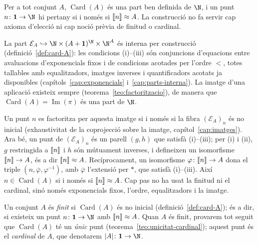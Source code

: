\begin{proposicio}\label{prop:card-interna}
Per a tot conjunt \(A\), \(\operatorname{Card}(A)\) és una part ben
definida de \(\N\), i un punt \(n\colon\mathbf1\to\N\) hi pertany si i
només si \(\llbracket n\rrbracket\approx A\). La construcció no fa servir cap axioma
d'elecció ni cap noció prèvia de finitud o cardinal.
\end{proposicio}

\begin{prova}
La part \(\mathcal E_A\hookrightarrow\N\times(A+\mathbf1)^{\N}\times\N^{A}\)
és interna per construcció (definició~\ref{def:card-A}): les condicions
(i)--(iii) són conjuncions d'equacions entre avaluacions d'exponencials
fixos i de condicions acotades per l'ordre \(<\), totes tallables amb
equalitzadors, imatges inverses i quantificadors acotats ja disponibles
(capítols~\ref{cap:exponencials} i~\ref{cap:parts-interna}). La imatge
d'una aplicació existeix sempre (teorema~\ref{teo:factoritzacio}), de
manera que \(\operatorname{Card}(A)=\operatorname{Im}(\pi)\) és una part de
\(\N\).

Un punt \(n\) es factoritza per aquesta imatge si i només si la fibra
\((\mathcal E_A)_n\) és no inicial (exhaustivitat de la coprojecció sobre
la imatge, capítol~\ref{cap:imatges}). Ara bé, un punt de \((\mathcal
E_A)_n\) és un parell \((g,h)\) que satisfà (i)--(iii); per (i) i (ii),
\(g\) restringida a \(\llbracket n\rrbracket\) i \(h\) són mútuament inverses, i
defineixen un isomorfisme \(\llbracket n\rrbracket\to A\), és a dir \(\llbracket n\rrbracket\approx A\).
Recíprocament, un isomorfisme \(\varphi\colon\llbracket n\rrbracket\to A\) dona el triple
\((n,\bar\varphi,\varphi^{-1})\), amb \(\bar\varphi\) l'extensió per
\(\ast\), que satisfà (i)--(iii). Així \(n\in\operatorname{Card}(A)\) si i
només si \(\llbracket n\rrbracket\approx A\). Cap pas no ha usat la finitud ni el
cardinal, sinó només exponencials fixos, l'ordre, equalitzadors i la
imatge.
\end{prova}

\begin{definicio}\label{def:conjunt-finit}
Un conjunt \(A\) és \emph{finit} si \(\operatorname{Card}(A)\) és no
inicial (definició~\ref{def:card-A}); és a dir, si existeix un punt
\(n\colon\mathbf1\to\N\) amb \(\llbracket n\rrbracket\approx A\). Quan \(A\) és finit,
provarem tot seguit que \(\operatorname{Card}(A)\) té un \emph{únic} punt
(teorema~\ref{teo:unicitat-cardinal}); aquest punt és el \emph{cardinal}
de \(A\), que denotarem \(|A|\colon\mathbf1\to\N\).
\end{definicio}

